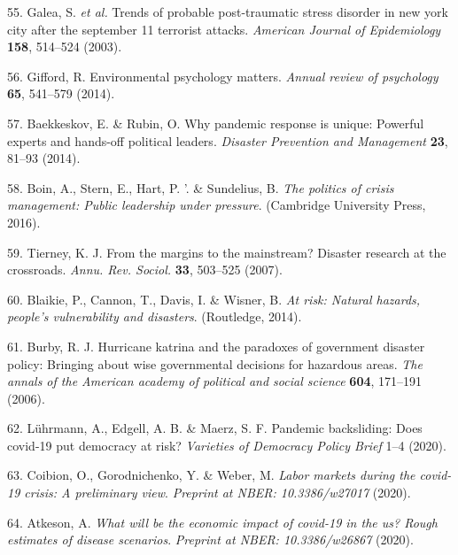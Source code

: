 \documentclass[]{article}
\begin{document}
\leavevmode\hypertarget{ref-galea2003trends}{}%
55. Galea, S. \emph{et al.} Trends of probable post-traumatic stress disorder in new york city after the september 11 terrorist attacks. \emph{American Journal of Epidemiology} \textbf{158}, 514--524 (2003).

\leavevmode\hypertarget{ref-gifford2014environmental}{}%
56. Gifford, R. Environmental psychology matters. \emph{Annual review of psychology} \textbf{65}, 541--579 (2014).

\leavevmode\hypertarget{ref-baekkeskov2014pandemic}{}%
57. Baekkeskov, E. \& Rubin, O. Why pandemic response is unique: Powerful experts and hands-off political leaders. \emph{Disaster Prevention and Management} \textbf{23}, 81--93 (2014).

\leavevmode\hypertarget{ref-boin2016politics}{}%
58. Boin, A., Stern, E., Hart, P. '. \& Sundelius, B. \emph{The politics of crisis management: Public leadership under pressure}. (Cambridge University Press, 2016).

\leavevmode\hypertarget{ref-tierney2007margins}{}%
59. Tierney, K. J. From the margins to the mainstream? Disaster research at the crossroads. \emph{Annu. Rev. Sociol.} \textbf{33}, 503--525 (2007).

\leavevmode\hypertarget{ref-blaikie2014risk}{}%
60. Blaikie, P., Cannon, T., Davis, I. \& Wisner, B. \emph{At risk: Natural hazards, people's vulnerability and disasters}. (Routledge, 2014).

\leavevmode\hypertarget{ref-burby2006hurricane}{}%
61. Burby, R. J. Hurricane katrina and the paradoxes of government disaster policy: Bringing about wise governmental decisions for hazardous areas. \emph{The annals of the American academy of political and social science} \textbf{604}, 171--191 (2006).

\leavevmode\hypertarget{ref-luhrmann2020}{}%
62. Lührmann, A., Edgell, A. B. \& Maerz, S. F. Pandemic backsliding: Does covid-19 put democracy at risk? \emph{Varieties of Democracy Policy Brief} 1--4 (2020).

\leavevmode\hypertarget{ref-coibion2020labor}{}%
63. Coibion, O., Gorodnichenko, Y. \& Weber, M. \emph{Labor markets during the covid-19 crisis: A preliminary view}. \emph{Preprint at NBER: 10.3386/w27017} (2020).

\leavevmode\hypertarget{ref-atkeson2020will}{}%
64. Atkeson, A. \emph{What will be the economic impact of covid-19 in the us? Rough estimates of disease scenarios}. \emph{Preprint at NBER: 10.3386/w26867} (2020).
\end{document}
